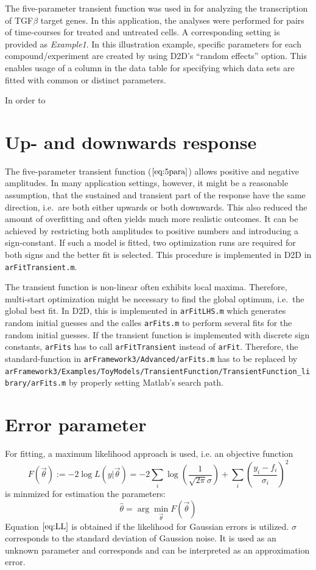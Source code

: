 \documentclass[pdftex, a4paper]{scrartcl}	%
\begin{document}
The five-parameter transient function was used in \cite{Lucarelli} for analyzing the transcription of TGF$\beta$ target genes.
In this application, the analyses were performed for pairs of time-courses for treated and untreated cells.
A corresponding setting is provided as \emph{Example1}.
In this illustration example, specific parameters for each compound/experiment are created by using D2D's ``random effects'' option. This enables usage of a column in the data table for specifying which data sets are fitted with common or distinct parameters.

In order to 

\section{Up- and downwards response}
The five-parameter transient function ($\ref{eq:5para}$) allows positive and negative amplitudes.
In many application settings, however, it might be a reasonable assumption, that the sustained and transient part of the response have the same direction, i.e.~are both either upwards or both downwards.
This also reduced the amount of overfitting and often yields much more realistic outcomes.
It can be achieved by restricting both amplitudes to positive numbers and introducing a sign-constant.
If such a model is fitted, two optimization runs are required for both signs and the better fit is selected.
This procedure is implemented in D2D in \texttt{arFitTransient.m}.

The transient function is non-linear often exhibits local maxima. 
Therefore, multi-start optimization might be necessary to find the global optimum, i.e.~the global best fit.
In D2D, this is implemented in \texttt{arFitLHS.m} which generates random initial guesses and the calles \texttt{arFits.m} to perform several fits for the random initial guesses.
If the transient function is implemented with discrete sign constants, \texttt{arFits} has to call \texttt{arFitTransient} instead of \texttt{arFit}. 
Therefore, the standard-function in \texttt{arFramework3/Advanced/arFits.m} has to be replaced by \texttt{arFramework3/Examples/ToyModels/TransientFunction/TransientFunction\_library/arFits.m} by properly setting Matlab's search path.


\section{Error parameter}
For fitting, a maximum likelihood approach is used, i.e. an objective function
\begin{equation} \label{eq:LL}
	F(\vec \theta) := -2 \log L(y|\vec\theta) = -2 \sum_i \log \left( \frac 1 {\sqrt{2\pi}\sigma} \right) + \sum_i \left(  \frac{y_i - f_i}{\sigma_i} \right)^2
	\end{equation}
	is minmized for estimation the parameters:
	\begin{equation}
		\hat \theta = \arg  \min_{\vec \theta} F(\vec\theta)
	\end{equation}
	Equation $\ref{eq:LL}$ is obtained if the likelihood for Gaussian errors is utilized. 
	$\sigma$ corresponds to the standard deviation of Gaussion noise.
	It is used as an unknown parameter and corresponds and can be interpreted as an approximation error.
\end{document}
